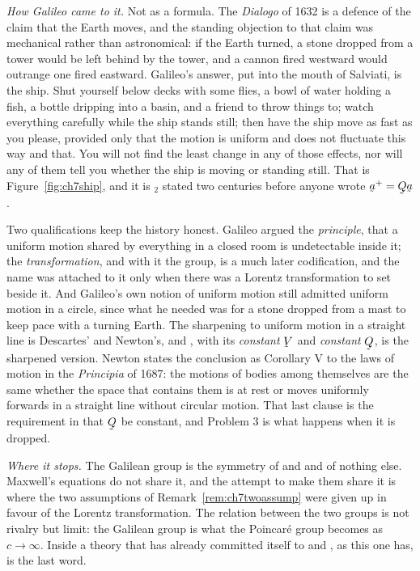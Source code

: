 \begin{remark}
\emph{How Galileo came to it.} Not as a formula. The \emph{Dialogo} of
1632 is a defence of the claim that the Earth moves, and the standing
objection to that claim was mechanical rather than astronomical: if the
Earth turned, a stone dropped from a tower would be left behind by the
tower, and a cannon fired westward would outrange one fired eastward.
Galileo's answer, put into the mouth of Salviati, is the ship. Shut
yourself below decks with some flies, a bowl of water holding a fish, a
bottle dripping into a basin, and a friend to throw things to; watch
everything carefully while the ship stands still; then have the ship move
as fast as you please, provided only that the motion is uniform and does
not fluctuate this way and that. You will not find the least change in
any of those effects, nor will any of them tell you whether the ship is
moving or standing still. That is Figure~\ref{fig:ch7ship}, and it is
$_{2}$ stated two centuries before anyone wrote
$\ba^{+}=\bQ\ba$.

Two qualifications keep the history honest. Galileo argued the
\emph{principle}, that a uniform motion shared by everything in a closed
room is undetectable inside it; the \emph{transformation}, and with it
the group, is a much later codification, and the name was attached to it
only when there was a Lorentz transformation to set beside it. And
Galileo's own notion of uniform motion still admitted uniform motion in a
circle, since what he needed was for a stone dropped from a mast to keep
pace with a turning Earth. The sharpening to uniform motion in a straight
line is Descartes' and Newton's, and , with its \emph{constant}
$\bV$ and \emph{constant} $\bQ$, is the sharpened version. Newton states
the conclusion as Corollary V to the laws of motion in the
\emph{Principia} of 1687: the motions of bodies among themselves are the
same whether the space that contains them is at rest or moves uniformly
forwards in a straight line without circular motion. That last clause is
the requirement in  that $\bQ$ be constant, and Problem 3 is
what happens when it is dropped.

\emph{Where it stops.} The Galilean group is the symmetry of 
and  and of nothing else. Maxwell's equations do not share it,
and the attempt to make them share it is where the two assumptions of
Remark~\ref{rem:ch7twoassump} were given up in favour of the Lorentz
transformation. The relation between the two groups is not rivalry but
limit: the Galilean group is what the Poincar\'e group becomes as
$c\to\infty$. Inside a theory that has already committed itself to
 and , as this one has,  is the last word.
\end{remark}

